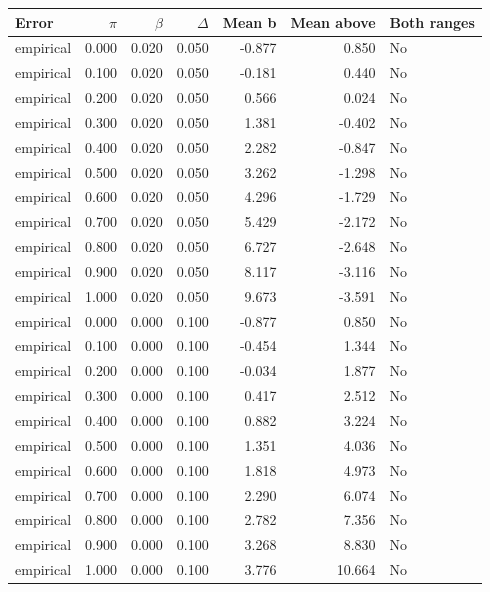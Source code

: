 \begin{tabular}{lrrrrrl}
\toprule
Error & $\pi$ & $\beta$ & $\Delta$ & Mean b & Mean above & Both ranges \\
\midrule
empirical & 0.000 & 0.020 & 0.050 & -0.877 & 0.850 & No \\
empirical & 0.100 & 0.020 & 0.050 & -0.181 & 0.440 & No \\
empirical & 0.200 & 0.020 & 0.050 & 0.566 & 0.024 & No \\
empirical & 0.300 & 0.020 & 0.050 & 1.381 & -0.402 & No \\
empirical & 0.400 & 0.020 & 0.050 & 2.282 & -0.847 & No \\
empirical & 0.500 & 0.020 & 0.050 & 3.262 & -1.298 & No \\
empirical & 0.600 & 0.020 & 0.050 & 4.296 & -1.729 & No \\
empirical & 0.700 & 0.020 & 0.050 & 5.429 & -2.172 & No \\
empirical & 0.800 & 0.020 & 0.050 & 6.727 & -2.648 & No \\
empirical & 0.900 & 0.020 & 0.050 & 8.117 & -3.116 & No \\
empirical & 1.000 & 0.020 & 0.050 & 9.673 & -3.591 & No \\
empirical & 0.000 & 0.000 & 0.100 & -0.877 & 0.850 & No \\
empirical & 0.100 & 0.000 & 0.100 & -0.454 & 1.344 & No \\
empirical & 0.200 & 0.000 & 0.100 & -0.034 & 1.877 & No \\
empirical & 0.300 & 0.000 & 0.100 & 0.417 & 2.512 & No \\
empirical & 0.400 & 0.000 & 0.100 & 0.882 & 3.224 & No \\
empirical & 0.500 & 0.000 & 0.100 & 1.351 & 4.036 & No \\
empirical & 0.600 & 0.000 & 0.100 & 1.818 & 4.973 & No \\
empirical & 0.700 & 0.000 & 0.100 & 2.290 & 6.074 & No \\
empirical & 0.800 & 0.000 & 0.100 & 2.782 & 7.356 & No \\
empirical & 0.900 & 0.000 & 0.100 & 3.268 & 8.830 & No \\
empirical & 1.000 & 0.000 & 0.100 & 3.776 & 10.664 & No \\
\bottomrule
\end{tabular}
\par\medskip

